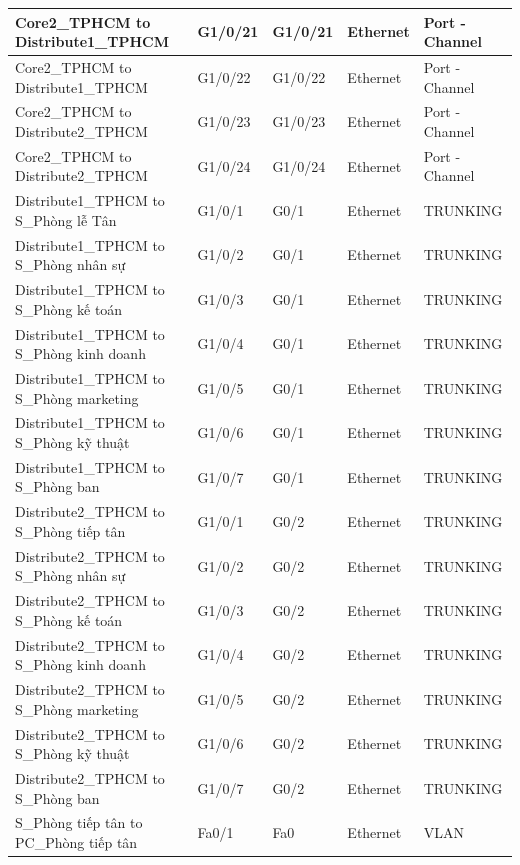 \documentclass[12pt,a4paper]{report}
\begin{document}
\begin{center}
\begin{longtable}{|p{}|p{}|p{}|p{}|p{}|}
\hline  Core2\_TPHCM  to  Distribute1\_TPHCM  &  G1/0/21  &  G1/0/21  &  Ethernet  &  Port - Channel \\
\hline  Core2\_TPHCM  to  Distribute1\_TPHCM  &  G1/0/22  &  G1/0/22  &  Ethernet  &  Port - Channel \\
\hline  Core2\_TPHCM  to  Distribute2\_TPHCM  &  G1/0/23  &  G1/0/23  &  Ethernet  &  Port - Channel \\
\hline  Core2\_TPHCM  to  Distribute2\_TPHCM  &  G1/0/24  &  G1/0/24  &  Ethernet  &  Port - Channel \\
\hline  Distribute1\_TPHCM  to  S\_Phòng lễ Tân  &  G1/0/1  &  G0/1  &  Ethernet  &  TRUNKING \\
\hline  Distribute1\_TPHCM  to  S\_Phòng nhân sự  &  G1/0/2  &  G0/1  &  Ethernet  &  TRUNKING \\
\hline  Distribute1\_TPHCM  to  S\_Phòng kế toán  &  G1/0/3  &  G0/1  &  Ethernet  &  TRUNKING \\
\hline  Distribute1\_TPHCM  to  S\_Phòng kinh doanh  &  G1/0/4  &  G0/1  &  Ethernet  &  TRUNKING \\
\hline  Distribute1\_TPHCM  to  S\_Phòng marketing  &  G1/0/5  &  G0/1  &  Ethernet  &  TRUNKING \\
\hline  Distribute1\_TPHCM  to  S\_Phòng kỹ thuật  &  G1/0/6  &  G0/1  &  Ethernet  &  TRUNKING \\
\hline  Distribute1\_TPHCM  to  S\_Phòng ban  &  G1/0/7  &  G0/1  &  Ethernet  &  TRUNKING \\
\hline  Distribute2\_TPHCM  to  S\_Phòng tiếp tân  &  G1/0/1  &  G0/2  &  Ethernet  &  TRUNKING \\
\hline  Distribute2\_TPHCM  to  S\_Phòng nhân sự  &  G1/0/2  &  G0/2  &  Ethernet  &  TRUNKING \\
\hline  Distribute2\_TPHCM  to  S\_Phòng kế toán  &  G1/0/3  &  G0/2  &  Ethernet  &  TRUNKING \\
\hline  Distribute2\_TPHCM  to  S\_Phòng kinh doanh  &  G1/0/4  &  G0/2  &  Ethernet  &  TRUNKING \\
\hline  Distribute2\_TPHCM  to  S\_Phòng marketing  &  G1/0/5  &  G0/2  &  Ethernet  &  TRUNKING \\
\hline  Distribute2\_TPHCM  to  S\_Phòng kỹ thuật  &  G1/0/6  &  G0/2  &  Ethernet  &  TRUNKING \\
\hline  Distribute2\_TPHCM  to  S\_Phòng ban  &  G1/0/7  &  G0/2  &  Ethernet  &  TRUNKING \\
\hline  S\_Phòng tiếp tân  to  PC\_Phòng tiếp tân  &  Fa0/1  &  Fa0  &  Ethernet  &  VLAN \\

\end{longtable}
\end{center}
\end{document}
